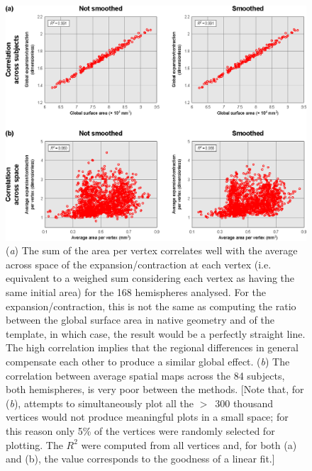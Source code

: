 \begin{figure}[!tp]  %
\centering
\includegraphics[width=14cm]{images/scatter.eps}
\caption[Comparison with expansion/contraction methods (\textsc{ii}).]{(\emph{a}) The sum of the area per vertex correlates well with the average across space of the expansion/contraction at each vertex (i.e. equivalent to a weighed sum considering each vertex as having the same initial area) for the 168 hemispheres analysed. For the expansion/contraction, this is not the same as computing the ratio between the global surface area in native geometry and of the template, in which case, the result would be a perfectly straight line. The high correlation implies that the regional differences in general compensate each other to produce a similar global effect. (\emph{b}) The correlation between average spatial maps across the 84 subjects, both hemispheres, is very poor between the methods. [Note that, for (\emph{b}), attempts to simultaneously plot all the $>$~300 thousand vertices would not produce meaningful plots in a small space; for this reason only 5\% of the vertices were randomly selected for plotting. The $R^2$ were computed from all vertices and, for both (a) and (b), the value corresponds to the goodness of a linear fit.]}
\label{fig:areal:scatter}
\end{figure}


